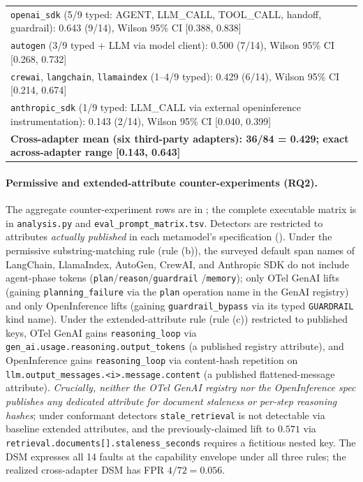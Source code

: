 \documentclass[a4paper,UKenglish,cleveref,autoref,thm-restate]{lipics-v2021}
\begin{document}
\begin{table}[t]
{\begin{tabular}{lcccclccccl}
\multicolumn{11}{l}{\quad\texttt{openai\_sdk} (5/9 typed: AGENT, LLM\_CALL, TOOL\_CALL, handoff, guardrail): 0.643 (9/14), Wilson 95\% CI [0.388, 0.838]} \\
\multicolumn{11}{l}{\quad\texttt{autogen} (3/9 typed + LLM via model client): 0.500 (7/14), Wilson 95\% CI [0.268, 0.732]} \\
\multicolumn{11}{l}{\quad\texttt{crewai}, \texttt{langchain}, \texttt{llamaindex} (1--4/9 typed): 0.429 (6/14), Wilson 95\% CI [0.214, 0.674]} \\
\multicolumn{11}{l}{\quad\texttt{anthropic\_sdk} (1/9 typed: LLM\_CALL via external openinference instrumentation): 0.143 (2/14), Wilson 95\% CI [0.040, 0.399]} \\
\multicolumn{11}{l}{\quad\textbf{Cross-adapter mean (six third-party adapters): 36/84 = 0.429; exact across-adapter range [0.143, 0.643]}} \\
\bottomrule
\end{tabular}
}
\end{table}

\paragraph*{Permissive and extended-attribute counter-experiments (RQ2).}
\label{sec:permissive-results}
The aggregate counter-experiment rows are in ; the
complete executable matrix is in \texttt{analysis.py} and
\texttt{eval\_prompt\_matrix.tsv}. Detectors are restricted to
attributes \emph{actually published} in each metamodel's specification
(). Under the permissive substring-matching
rule (rule (b)), the surveyed default span names of LangChain,
LlamaIndex, AutoGen, CrewAI, and Anthropic SDK do not include
agent-phase tokens (\texttt{plan}/\texttt{reason}/\texttt{guardrail}
/\texttt{memory}); only OTel GenAI lifts (gaining
\texttt{planning\_failure} via the \texttt{plan} operation name in
the GenAI registry) and only OpenInference lifts (gaining
\texttt{guardrail\_bypass} via its typed \texttt{GUARDRAIL} kind name).
Under the extended-attribute rule (rule (c)) restricted to published
keys, OTel GenAI gains \texttt{reasoning\_loop} via
\texttt{gen\_ai.usage.reasoning.output\_tokens} (a published registry
attribute), and OpenInference gains \texttt{reasoning\_loop} via
content-hash repetition on \texttt{llm.output\_messages.\textless i\textgreater.message.content}
(a published flattened-message attribute).  \emph{Crucially,
neither the OTel GenAI registry nor the OpenInference spec
publishes any dedicated attribute for document staleness or
per-step reasoning hashes}; under conformant detectors
\texttt{stale\_retrieval} is not detectable via baseline extended
attributes, and the previously-claimed lift to $0.571$ via
\texttt{retrieval.documents[].staleness\_seconds} requires a
fictitious nested key.  The DSM expresses all 14 faults at the
capability envelope under all three rules; the realized
cross-adapter DSM has FPR $4/72 = 0.056$.
\end{document}
